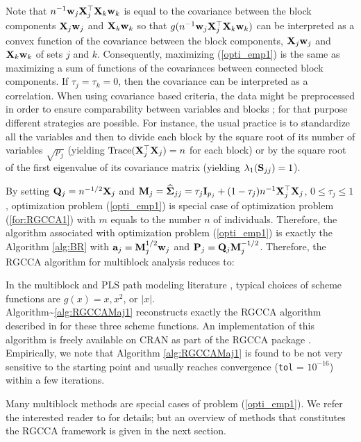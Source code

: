 \documentclass[
]{jss}
\begin{document}
Note that \(n^{-1}\mathbf{w}_j\mathbf{X}_j^\top \mathbf{X}_k\mathbf{w}_k\) is equal to
the covariance between the block components \(\mathbf{X}_j\mathbf{w}_j\) and
\(\mathbf{X}_k\mathbf{w}_k\) so that
\(g(n^{-1}\mathbf{w}_j\mathbf{X}_j^\top \mathbf{X}_k\mathbf{w}_k)\) can be interpreted
as a convex function of the covariance between the block components,
\(\mathbf{X}_j\mathbf{w}_j\) and \(\mathbf{X}_k\mathbf{w}_k\) of sets \(j\) and \(k\).
Consequently, maximizing (\ref{opti_emp1}) is the same as maximizing a
sum of functions of the covariances between connected block components.
If \(\tau_j = \tau_k = 0\), then the covariance can be interpreted as a
correlation. When using covariance based criteria, the data might be
preprocessed in order to ensure comparability between variables and
blocks ; for that purpose different strategies are possible. For
instance, the usual practice is to standardize all the variables and
then to divide each block by the square root of its number of variables
\(\sqrt{p_j}\) \citep{Wold1987} (yielding
\(\text{Trace}(\mathbf{X}_j^\top\mathbf{X}_j) = n\) for each block) or by the square
root of the first eigenvalue of its covariance matrix
\citep{Escofier1994} (yielding \(\lambda_1(\mathbf{S}_{jj}) = 1\)).

By setting \(\mathbf{Q}_j = n^{-1/2}\mathbf{X}_j\) and
\(\mathbf{M}_j = \widehat{\mathbf{\Sigma}}_{jj} = \tau_j\mathbf{I}_{p_j} + (1-\tau_j)n^{-1}\mathbf{X}_j^\top\mathbf{X}_j\),
\(0 \leq \tau_j \leq 1\), optimization problem (\ref{opti_emp1}) is
special case of optimization problem (\ref{for:RGCCA1}) with \(m\)
equals to the number \(n\) of individuals. Therefore, the algorithm
associated with optimization problem (\ref{opti_emp1}) is exactly the
Algorithm \ref{alg:BR} with \(\mathbf{a}_j = \mathbf{M}_j^{1/2}\mathbf{w}_j\) and
\(\mathbf{P}_j = \mathbf{Q}_j\mathbf{M}_j^{-1/2}\). Therefore, the RGCCA algorithm for
multiblock analysis reduces to:

In the multiblock and PLS path modeling literature
\citep{Tenenhaus2005}, typical choices of scheme functions are
\(g(x) = x, x^2\), or \(\vert x \vert\).\\
Algorithm\textasciitilde{}\ref{alg:RGCCAMaj1} reconstructs exactly the
RGCCA algorithm described in \citep{Tenenhaus2011,Tenenhaus2014} for
these three scheme functions. An implementation of this algorithm is
freely available on CRAN as part of the RGCCA package
\citep{Tenenhaus2013}. Empirically, we note that Algorithm
\ref{alg:RGCCAMaj1} is found to be not very sensitive to the starting
point and usually reaches convergence (\texttt{tol} = \(10^{-16}\))
within a few iterations.

Many multiblock methods are special cases of problem (\ref{opti_emp1}).
We refer the interested reader to
\citep{Tenenhaus2011, Tenenhaus2014, Tenenhaus2015b, 
Tenenhaus2017} for details; but an overview of methods that constitutes
the RGCCA framework is given in the next section.
\end{document}
